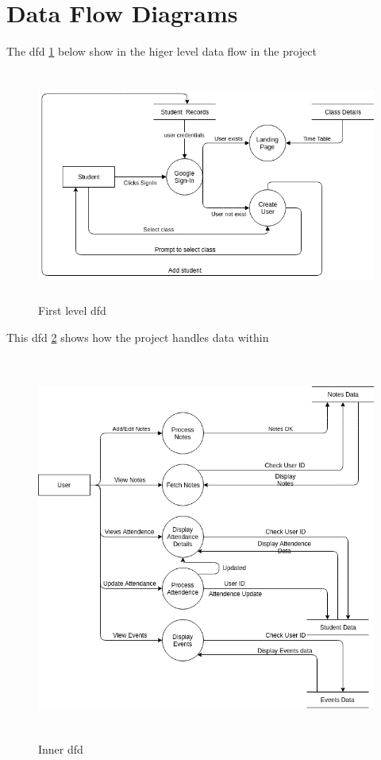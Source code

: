 \section{Data Flow Diagrams}

The dfd \ref{fig:dfd1} below show in the higer level data flow in the project

\vspace{1em}

\begin{figure}[H]
\centering
\includegraphics[height=3in, clip=true]{./dfd1}
\caption{First level dfd}
\label{fig:dfd1}
\end{figure}

\vspace{1em}

This dfd \ref{fig:dfd2} shows how the project handles data within

\vspace{1em}

\begin{figure}[H]
\centering
\includegraphics[height=5in, clip=true]{./dfd2}
\caption{Inner dfd}
\label{fig:dfd2}
\end{figure}
